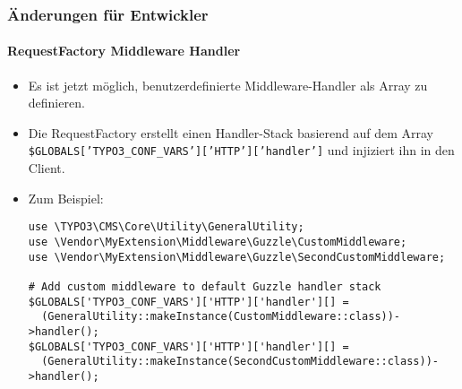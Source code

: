 \begin{frame}[fragile]
	\frametitle{Änderungen für Entwickler}
	\framesubtitle{RequestFactory Middleware Handler}

	\lstset{basicstyle=\tiny\ttfamily}

	\begin{itemize}
		\item Es ist jetzt möglich, benutzerdefinierte Middleware-Handler als Array zu definieren.
		\item Die RequestFactory erstellt einen Handler-Stack basierend auf dem Array\newline
			\small
				\texttt{\$GLOBALS['TYPO3\_CONF\_VARS']['HTTP']['handler']}
			\normalsize
			und injiziert ihn in den Client.
		\item Zum Beispiel:

\begin{lstlisting}
use \TYPO3\CMS\Core\Utility\GeneralUtility;
use \Vendor\MyExtension\Middleware\Guzzle\CustomMiddleware;
use \Vendor\MyExtension\Middleware\Guzzle\SecondCustomMiddleware;

# Add custom middleware to default Guzzle handler stack
$GLOBALS['TYPO3_CONF_VARS']['HTTP']['handler'][] =
  (GeneralUtility::makeInstance(CustomMiddleware::class))->handler();
$GLOBALS['TYPO3_CONF_VARS']['HTTP']['handler'][] =
  (GeneralUtility::makeInstance(SecondCustomMiddleware::class))->handler();
\end{lstlisting}

	\end{itemize}

\end{frame}


